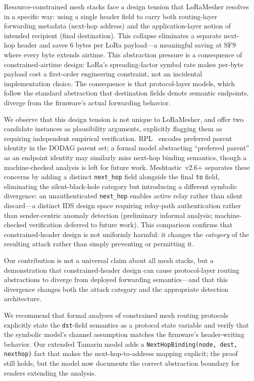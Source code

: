 \documentclass[preprint,12pt]{elsarticle}
\begin{document}
Resource-constrained mesh stacks face a design tension that
LoRaMesher resolves in a specific way: using a single header
field to carry both routing-layer forwarding metadata
(next-hop address) and the application-layer notion of
intended recipient (final destination).
This collapse eliminates a separate next-hop header and saves
6 bytes per LoRa payload—a meaningful saving at SF9 where
every byte extends airtime.
This abstraction pressure is a consequence of constrained-airtime
design: LoRa's spreading-factor symbol rate makes per-byte payload
cost a first-order engineering constraint, not an incidental
implementation choice.
The consequence is that protocol-layer models, which follow
the standard abstraction that destination fields denote
semantic endpoints, diverge from the firmware's actual
forwarding behavior.

We observe that this design tension is not unique to
LoRaMesher, and offer two candidate instances as plausibility
arguments, explicitly flagging them as requiring independent
empirical verification.
RPL~\cite{ietf-rfc7416} encodes preferred parent identity in the
DODAG parent set; a formal model abstracting ``preferred parent''
as an endpoint identity may similarly miss next-hop binding
semantics, though a machine-checked analysis is left for future work.
Meshtastic~v2.6+ separates these concerns by adding a distinct
\texttt{next\_hop} field alongside the final \texttt{to} field,
eliminating the silent-black-hole category but introducing a
different symbolic divergence: an unauthenticated \texttt{next\_hop}
enables active relay rather than silent discard—a distinct IDS
design space requiring relay-path authentication rather than
sender-centric anomaly detection (preliminary informal analysis;
machine-checked verification deferred to future work).
This comparison confirms that constrained-header design is not
uniformly harmful: it changes the \emph{category} of the
resulting attack rather than simply preventing or permitting it.

Our contribution is not a universal claim about all mesh stacks,
but a demonstration that constrained-header design can cause
protocol-layer routing abstractions to diverge from deployed
forwarding semantics—and that this divergence changes both the
attack category and the appropriate detection architecture.

We recommend that formal analyses of constrained mesh routing
protocols explicitly state the \texttt{dst}-field semantics as
a protocol state variable and verify that the symbolic model's
channel assumption matches the firmware's header-writing behavior.
Our extended Tamarin model adds a \texttt{NextHopBinding(node,
dest, nexthop)} fact that makes the next-hop-to-address mapping
explicit; the proof still holds, but the model now documents the
correct abstraction boundary for readers extending the analysis.
\end{document}
